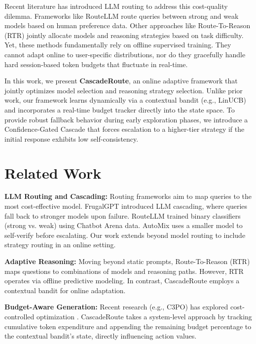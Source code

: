 \documentclass{article} %
\begin{document}
Recent literature has introduced LLM routing to address this cost-quality dilemma. Frameworks like RouteLLM \citep{ong2025routellm} route queries between strong and weak models based on human preference data. Other approaches like Route-To-Reason (RTR) \citep{rtr2025} jointly allocate models and reasoning strategies based on task difficulty. Yet, these methods fundamentally rely on offline supervised training. They cannot adapt online to user-specific distributions, nor do they gracefully handle hard session-based token budgets that fluctuate in real-time. 

In this work, we present \textbf{CascadeRoute}, an online adaptive framework that jointly optimizes model selection and reasoning strategy selection. Unlike prior work, our framework learns dynamically via a contextual bandit (e.g., LinUCB) and incorporates a real-time budget tracker directly into the state space. To provide robust fallback behavior during early exploration phases, we introduce a Confidence-Gated Cascade that forces escalation to a higher-tier strategy if the initial response exhibits low self-consistency.

\section{Related Work}

\textbf{LLM Routing and Cascading:} Routing frameworks aim to map queries to the most cost-effective model. FrugalGPT \citep{chen2023frugalgpt} introduced LLM cascading, where queries fall back to stronger models upon failure. RouteLLM \citep{ong2025routellm} trained binary classifiers (strong vs. weak) using Chatbot Arena data. AutoMix \citep{aggarwal2024automix} uses a smaller model to self-verify before escalating. Our work extends beyond model routing to include strategy routing in an online setting.

\textbf{Adaptive Reasoning:} Moving beyond static prompts, Route-To-Reason (RTR) \citep{rtr2025} maps questions to combinations of models and reasoning paths. However, RTR operates via offline predictive modeling. In contrast, CascadeRoute employs a contextual bandit for online adaptation.

\textbf{Budget-Aware Generation:} Recent research (e.g., C3PO) has explored cost-controlled optimization \citep{c3po2025}. CascadeRoute takes a system-level approach by tracking cumulative token expenditure and appending the remaining budget percentage to the contextual bandit's state, directly influencing action values.
\end{document}
